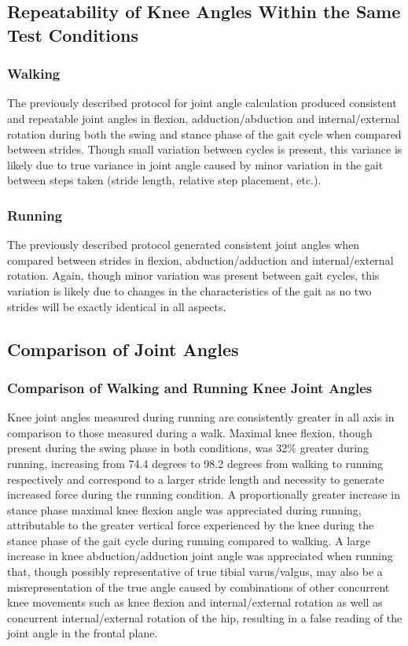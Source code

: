 \documentclass[10pt]{IEEEtran}
\begin{document}
    \subsection{Repeatability of Knee Angles Within the Same Test Conditions}
    \subsubsection{Walking}
    The previously described protocol for joint angle calculation produced consistent and repeatable joint angles in flexion, adduction/abduction and internal/external rotation during both the swing and stance phase of the gait cycle when compared between strides. Though small variation between cycles is present, this variance is likely due to true variance in joint angle caused by minor variation in the gait between steps taken (stride length, relative step placement, etc.). 
    \subsubsection{Running}
    The previously described protocol generated consistent joint angles when compared between strides in flexion, abduction/adduction and internal/external rotation. Again, though minor variation was present between gait cycles, this variation is likely due to changes in the characteristics of the gait as no two strides will be exactly identical in all aspects. 

    \subsection{Comparison of Joint Angles}
    \subsubsection{Comparison of Walking and Running Knee Joint Angles}
    Knee joint angles measured during running are consistently greater in all axis in comparison to those measured during a walk. Maximal knee flexion, though present during the swing phase in both conditions, was 32\% greater during running, increasing from 74.4 degrees to 98.2 degrees from walking to running respectively and correspond to a larger stride length and necessity to generate increased force during the running condition. A proportionally greater increase in stance phase maximal knee flexion angle was appreciated during running, attributable to the greater vertical force experienced by the knee during the stance phase of the gait cycle during running compared to walking. A large increase in knee abduction/adduction joint angle was appreciated when running that, though possibly representative of true tibial varus/valgus, may also be a misrepresentation of the true angle caused by combinations of other concurrent knee movements such as knee flexion and internal/external rotation as well as concurrent internal/external rotation of the hip, resulting in a false reading of the joint angle in the frontal plane. 
\end{document}
